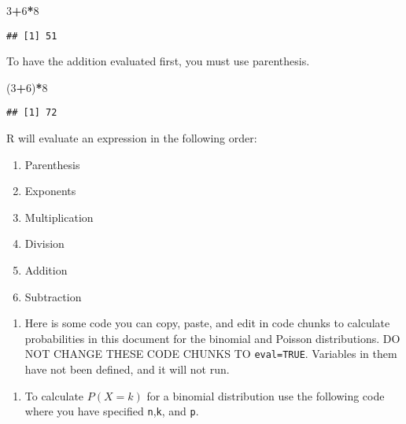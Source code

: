 \documentclass[]{article}
\newenvironment{Shaded}{\begin{snugshade}}{\end{snugshade}}
\newcommand{\DecValTok}[1]{\textcolor[rgb]{0.00,0.00,0.81}{#1}}
\newcommand{\NormalTok}[1]{#1}
\newcommand{\OperatorTok}[1]{\textcolor[rgb]{0.81,0.36,0.00}{\textbf{#1}}}
\providecommand{\tightlist}{%
  \setlength{\itemsep}{0pt}\setlength{\parskip}{0pt}}
\begin{document}
\begin{Shaded}
\begin{Highlighting}[]
\DecValTok{3}\OperatorTok{+}\DecValTok{6}\OperatorTok{*}\DecValTok{8}
\end{Highlighting}
\end{Shaded}

\begin{verbatim}
## [1] 51
\end{verbatim}

To have the addition evaluated first, you must use parenthesis.

\begin{Shaded}
\begin{Highlighting}[]
\NormalTok{(}\DecValTok{3}\OperatorTok{+}\DecValTok{6}\NormalTok{)}\OperatorTok{*}\DecValTok{8}
\end{Highlighting}
\end{Shaded}

\begin{verbatim}
## [1] 72
\end{verbatim}

R will evaluate an expression in the following order:

\begin{enumerate}
\def\labelenumi{\arabic{enumi})}
\item
  Parenthesis
\item
  Exponents
\item
  Multiplication
\item
  Division
\item
  Addition
\item
  Subtraction
\end{enumerate}

\begin{enumerate}
\def\labelenumi{\arabic{enumi}.}
\setcounter{enumi}{4}
\tightlist
\item
  Here is some code you can copy, paste, and edit in code chunks to
  calculate probabilities in this document for the binomial and Poisson
  distributions. DO NOT CHANGE THESE CODE CHUNKS TO \texttt{eval=TRUE}.
  Variables in them have not been defined, and it will not run.
\end{enumerate}

\begin{enumerate}
\def\labelenumi{\alph{enumi})}
\tightlist
\item
  To calculate \(P(X = k)\) for a binomial distribution use the
  following code where you have specified \texttt{n},\texttt{k}, and
  \texttt{p}.
\end{enumerate}
\end{document}
